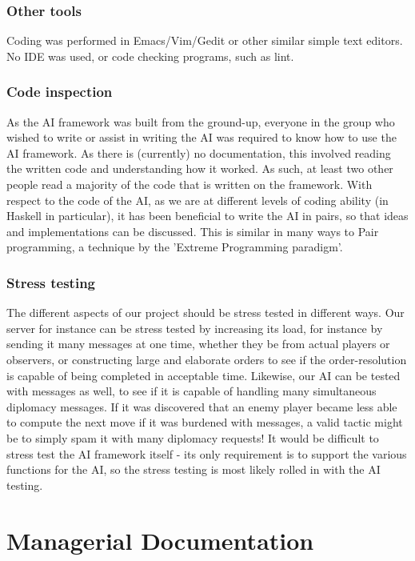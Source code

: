 \documentclass[11pt]{article}
\begin{document}
\subsubsection{Other tools}
Coding was performed in Emacs/Vim/Gedit or other similar simple text editors. No
IDE was used, or code checking programs, such as lint.

\subsubsection{Code inspection}
As the AI framework was built from the ground-up, everyone in the group who
wished to write or assist in writing the AI was required to know how to use the
AI framework. As there is (currently) no documentation, this involved reading
the written code and understanding how it worked. As such, at least two other 
people read a majority of the code that is written on the framework. With 
respect to the code of the AI, as we are at different levels of coding ability 
(in Haskell in particular), it has been beneficial to write the AI in pairs, so
that ideas and implementations can be discussed. This is similar in many ways to
Pair programming, a technique by the 'Extreme Programming paradigm'.

\subsubsection{Stress testing}
The different aspects of our project should be stress tested in different ways.
Our server for instance can be stress tested by increasing its load, for 
instance by sending it many messages at one time, whether they be from actual
players or observers, or constructing large and elaborate orders to see if the
order-resolution is capable of being completed in acceptable time. Likewise, our
AI can be tested with messages as well, to see if it is capable of handling many
simultaneous diplomacy messages. If it was discovered that an enemy player 
became less able to compute the next move if it was burdened with messages, a 
valid tactic might be to simply spam it with many diplomacy requests! It would
be difficult to stress test the AI framework itself - its only requirement is to
support the various functions for the AI, so the stress testing is most likely
rolled in with the AI testing. 

\section{Managerial Documentation}
\end{document}
